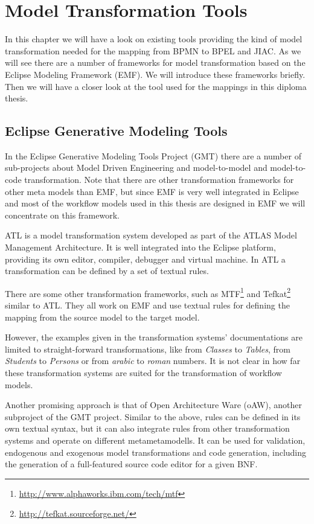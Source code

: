 \chapter{Model Transformation Tools}
\label{chapter:transformation}

In this chapter we will have a look on existing tools providing the kind of model transformation needed for the mapping from BPMN to BPEL and JIAC. As we will see there are a number of frameworks for model transformation based on the Eclipse Modeling Framework (EMF). We will introduce these frameworks briefly. Then we will have a closer look at the tool used for the mappings in this diploma thesis.



\section{Eclipse Generative Modeling Tools}

In the Eclipse Generative Modeling Tools Project (GMT) \cite{GMT} there are a number of sub-projects about Model Driven Engineering and model-to-model and model-to-code transformation. Note that there are other transformation frameworks for other meta models than EMF, but since EMF is very well integrated in Eclipse and most of the workflow models used in this thesis are designed in EMF we will concentrate on this framework.

ATL \cite{JK06a} is a  model transformation system developed as part of the ATLAS Model Management Architecture. It is well integrated into the Eclipse platform, providing its own editor, compiler, debugger and virtual machine. In ATL a transformation can be defined by a set of textual rules.

There are some other transformation frameworks, such as MTF\footnote{\url{http://www.alphaworks.ibm.com/tech/mtf}} and Tefkat\footnote{\url{http://tefkat.sourceforge.net/}} similar to ATL. They all work on EMF and use textual rules for defining the mapping from the source model to the target model.

However, the examples given in the transformation systems' documentations are limited to straight-forward transformations, like from \emph{Classes} to \emph{Tables}, from \emph{Students} to \emph{Persons} or from \emph{arabic} to \emph{roman} numbers. It is not clear in how far these transformation systems are suited for the transformation of workflow models.

Another promising approach is that of Open Architecture Ware (oAW), another subproject of the GMT project. Similar to the above, rules can be defined in its own textual syntax, but it can also integrate rules from other transformation systems and operate on different metametamodells. It can be used for validation, endogenous and exogenous model transformations and code generation, including the generation of a full-featured source code editor for a given BNF.



